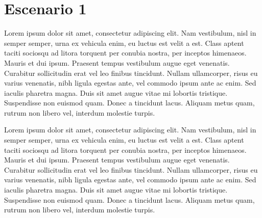 \newpage
\section{Escenario 1}

Lorem ipsum dolor sit amet, consectetur adipiscing elit. Nam vestibulum, nisl in semper semper, urna ex vehicula enim, eu luctus est velit a est. Class aptent taciti sociosqu ad litora torquent per conubia nostra, per inceptos himenaeos. Mauris et dui ipsum. Praesent tempus vestibulum augue eget venenatis. Curabitur sollicitudin erat vel leo finibus tincidunt. Nullam ullamcorper, risus eu varius venenatis, nibh ligula egestas ante, vel commodo ipsum ante ac enim. Sed iaculis pharetra magna. Duis sit amet augue vitae mi lobortis tristique. Suspendisse non euismod quam. Donec a tincidunt lacus. Aliquam metus quam, rutrum non libero vel, interdum molestie turpis.

Lorem ipsum dolor sit amet, consectetur adipiscing elit. Nam vestibulum, nisl in semper semper, urna ex vehicula enim, eu luctus est velit a est. Class aptent taciti sociosqu ad litora torquent per conubia nostra, per inceptos himenaeos. Mauris et dui ipsum. Praesent tempus vestibulum augue eget venenatis. Curabitur sollicitudin erat vel leo finibus tincidunt. Nullam ullamcorper, risus eu varius venenatis, nibh ligula egestas ante, vel commodo ipsum ante ac enim. Sed iaculis pharetra magna. Duis sit amet augue vitae mi lobortis tristique. Suspendisse non euismod quam. Donec a tincidunt lacus. Aliquam metus quam, rutrum non libero vel, interdum molestie turpis.







